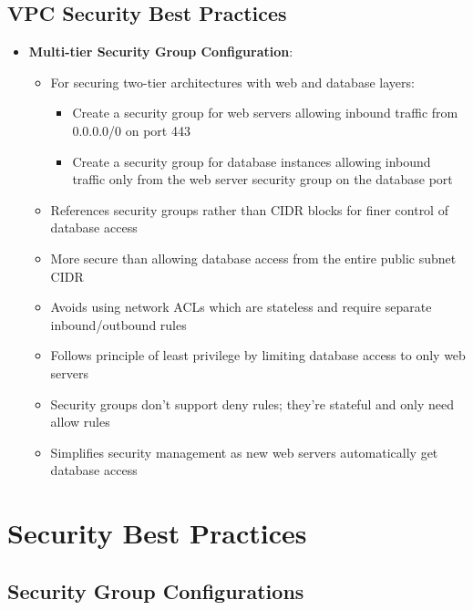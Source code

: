 \documentclass[11pt,a4paper]{report}
\begin{document}
\section{VPC Security Best Practices}

\begin{itemize}
  \item \textbf{Multi-tier Security Group Configuration}:
\begin{itemize}
  \item For securing two-tier architectures with web and database layers:
\begin{itemize}
  \item Create a security group for web servers allowing inbound traffic from 0.0.0.0/0 on port 443
  \item Create a security group for database instances allowing inbound traffic only from the web server security group on the database port
\end{itemize}
  \item References security groups rather than CIDR blocks for finer control of database access
  \item More secure than allowing database access from the entire public subnet CIDR
  \item Avoids using network ACLs which are stateless and require separate inbound/outbound rules
  \item Follows principle of least privilege by limiting database access to only web servers
  \item Security groups don't support deny rules; they're stateful and only need allow rules
  \item Simplifies security management as new web servers automatically get database access
\end{itemize}
\end{itemize}


\chapter{Security Best Practices}



\section{Security Group Configurations}
\end{document}
